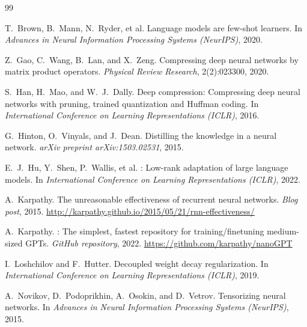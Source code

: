 \documentclass[11pt,a4paper]{article}
\theoremstyle{definition}
\begin{document}

\begin{thebibliography}{99}

T.~Brown, B.~Mann, N.~Ryder, et al.
\newblock Language models are few-shot learners.
\newblock In \emph{Advances in Neural Information Processing Systems (NeurIPS)}, 2020.

Z.~Gao, C.~Wang, B.~Lan, and X.~Zeng.
\newblock Compressing deep neural networks by matrix product operators.
\newblock \emph{Physical Review Research}, 2(2):023300, 2020.

S.~Han, H.~Mao, and W.~J.~Dally.
\newblock Deep compression: Compressing deep neural networks with pruning, trained quantization and {H}uffman coding.
\newblock In \emph{International Conference on Learning Representations (ICLR)}, 2016.

G.~Hinton, O.~Vinyals, and J.~Dean.
\newblock Distilling the knowledge in a neural network.
\newblock \emph{arXiv preprint arXiv:1503.02531}, 2015.

E.~J.~Hu, Y.~Shen, P.~Wallis, et al.
: Low-rank adaptation of large language models.
\newblock In \emph{International Conference on Learning Representations (ICLR)}, 2022.

A.~Karpathy.
\newblock The unreasonable effectiveness of recurrent neural networks.
\newblock \emph{Blog post}, 2015.
\newblock \url{http://karpathy.github.io/2015/05/21/rnn-effectiveness/}

A.~Karpathy.
: The simplest, fastest repository for training/finetuning medium-sized {GPT}s.
\newblock \emph{GitHub repository}, 2022.
\newblock \url{https://github.com/karpathy/nanoGPT}

I.~Loshchilov and F.~Hutter.
\newblock Decoupled weight decay regularization.
\newblock In \emph{International Conference on Learning Representations (ICLR)}, 2019.

A.~Novikov, D.~Podoprikhin, A.~Osokin, and D.~Vetrov.
\newblock Tensorizing neural networks.
\newblock In \emph{Advances in Neural Information Processing Systems (NeurIPS)}, 2015.


\end{thebibliography}
\end{document}
